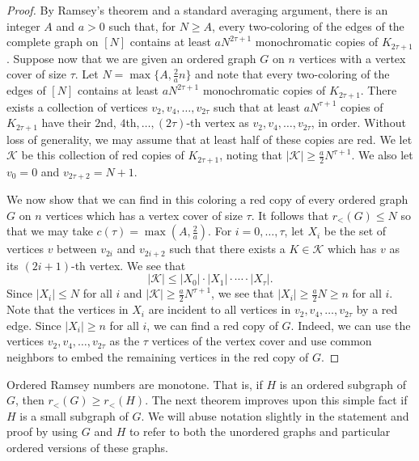 \documentclass[11pt]{article}
\begin{document}
\begin{proof}
By Ramsey's theorem and a standard averaging argument, there is an integer $A$ and $a>0$ such that, for $N\ge A$, every two-coloring of the edges of  the complete graph on $[N]$ contains at least $a N^{2\tau+1}$ monochromatic copies of $K_{2\tau+1}$. Suppose now that we are given an 
ordered graph $G$ on $n$ vertices with a vertex
cover of size $\tau$. Let $N=\max\{A, \frac{2}{a} n\}$ and note that every
two-coloring of the edges of $[N]$ contains at least $a N^{2\tau+1}$ monochromatic
copies of $K_{2\tau+1}$. There exists a collection of vertices $v_{2},v_{4},\dots,v_{2\tau}$
such that at least $a N^{\tau+1}$ copies of $K_{2\tau + 1}$ have their $2$nd, $4$th$,\dots, (2\tau)$-th
vertex as $v_{2}, v_{4},\dots, v_{2\tau}$, in order. Without loss of
generality, we may assume that at least half of these copies are red. We let
$\mathcal{K}$ be this collection of red copies of $K_{2\tau + 1}$, noting that $|\mathcal{K}| \geq \frac{a}{2} N^{\tau + 1}$. We also let $v_{0}=0$ and
$v_{2\tau+2}=N+1$. 

We now show that we can find in this coloring a red copy of every ordered graph $G$ on $n$ vertices which has a vertex cover of size $\tau$. It follows that $r_{<}(G) \leq N$ so that we may take $c(\tau)=\max(A,\frac{2}{a})$. 
For $i=0,\dots,\tau$, let $X_{i}$ be the set of vertices $v$ between
$v_{2i}$ and $v_{2i+2}$ such that there exists a $K\in\mathcal{K}$
which has $v$ as its $(2i+1)$-th vertex. We see that
\[|\mathcal{K}|\le|X_{0}|\cdot|X_{1}|\cdot\cdots\cdot|X_{\tau}|.\]
Since $|X_{i}|\le N$ for all $i$ and $|\mathcal{K}|\ge \frac{a}{2} N^{\tau+1}$,
we see that $|X_{i}|\ge \frac{a}{2} N\ge n$ for all $i$. 
Note that the vertices in $X_{i}$ are incident to all vertices in
$v_{2},v_{4},\dots,v_{2\tau}$ by a red edge. Since $|X_{i}|\ge n$
for all $i$, we can find a red copy of $G$. Indeed, we can use the vertices $v_2,v_4,\ldots,v_{2\tau}$ as the $\tau$ vertices of the vertex cover and use common neighbors to embed the remaining vertices in the red copy of $G$.  
\end{proof}

Ordered Ramsey numbers are monotone. That is, if $H$ is an ordered subgraph of $G$, then $r_<(G) \geq r_<(H)$. The next theorem improves upon this simple fact if $H$ is a small subgraph of $G$. We will abuse notation slightly in the statement and proof by using $G$ and $H$ to refer to both the unordered graphs and particular ordered versions of these graphs.
\end{document}
